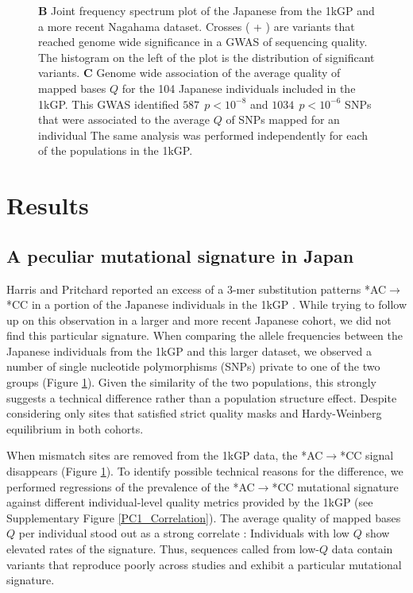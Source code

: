 \documentclass[9pt,lineno]{elife}
\begin{document}
\begin{figure}
{\textbf{B} 
Joint frequency spectrum plot of the Japanese from the 1kGP and a more recent Nagahama dataset.
Crosses ( + ) are variants that reached genome wide significance in a GWAS of sequencing quality. 
The histogram on the left of the plot is the distribution of significant variants. 
\textbf{C} 
Genome wide association of the average quality of mapped bases $Q$ for the 104 Japanese individuals included in the 1kGP. This GWAS identified $587\ \  p < 10^{-8}$ and $1034\ \ p < 10^{-6}$ SNPs that were associated to the average $Q$ of SNPs mapped for an individual
The same analysis was performed independently for each of the populations in the 1kGP. }
 \label{SFS}
\end{figure}


\section{Results}

			
\subsection{A peculiar mutational signature in Japan}			
	
Harris and Pritchard reported an excess of a 3-mer substitution patterns *AC${\rightarrow}$*CC in a portion of the Japanese individuals in the 1kGP \citep{Harris2017a}.
While trying to follow up on this observation in a larger and more recent Japanese cohort, we did not find this particular signature.
When comparing the allele frequencies between the Japanese individuals from the 1kGP and this larger dataset, we observed a number of single nucleotide polymorphisms (SNPs) private to one of the two groups (Figure \ref{SFS}).
Given the similarity of the two populations, this strongly suggests a technical difference rather than a population structure effect.
Despite considering only sites that satisfied strict quality masks and Hardy-Weinberg equilibrium in both cohorts.

When mismatch sites are removed from the 1kGP data, the  *AC${\rightarrow}$*CC signal disappears (Figure \ref{SFS}). To identify possible technical reasons for the difference, we performed regressions of the prevalence of the  *AC${\rightarrow}$*CC mutational signature against different individual-level quality metrics provided by the 1kGP (see Supplementary Figure \ref{PC1_Correlation}). 
The average quality of mapped bases  $Q$ per individual stood out as a strong correlate : Individuals with low $Q$ show elevated rates of the signature. 
Thus, sequences called from low-$Q$ data contain variants that reproduce poorly across studies and exhibit a particular mutational signature. 
\end{document}
